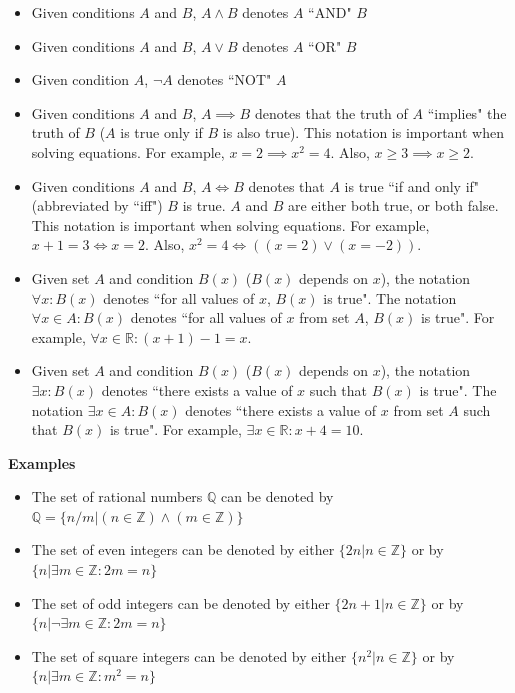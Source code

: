 \documentclass{article}
\begin{document}
\begin{itemize}
\item Given conditions \(A\) and \(B\), \(A \wedge B\) denotes \(A\) ``AND" \(B\)
\item Given conditions \(A\) and \(B\), \(A \vee B\) denotes \(A\) ``OR" \(B\)
\item Given condition \(A\), \(\neg A\) denotes ``NOT" \(A\)
\item Given conditions \(A\) and \(B\), \(A \implies B\) denotes that the truth of \(A\) ``implies" the truth of \(B\) (\(A\) is true only if \(B\) is also true). This notation is important when solving equations. For example, \(x = 2 \implies x^2 = 4\). Also, \(x \geq 3 \implies x \geq 2\).
\item Given conditions \(A\) and \(B\), \(A \iff B\) denotes that \(A\) is true ``if and only if" (abbreviated by ``iff") \(B\) is true. \(A\) and \(B\) are either both true, or both false. This notation is important when solving equations. For example, \(x + 1 = 3 \iff x = 2\). Also, \(x^2 = 4 \iff ((x = 2) \vee (x = -2))\).
\item Given set \(A\) and condition \(B(x)\) (\(B(x)\) depends on \(x\)), the notation \(\forall x : B(x)\) denotes ``for all values of \(x\), \(B(x)\) is true". The notation \(\forall x \in A : B(x)\) denotes ``for all values of \(x\) from set \(A\), \(B(x)\) is true". For example, \(\forall x \in \mathbb{R} : (x + 1) - 1 = x\).
\item Given set \(A\) and condition \(B(x)\) (\(B(x)\) depends on \(x\)), the notation \(\exists x : B(x)\) denotes ``there exists a value of \(x\) such that \(B(x)\) is true". The notation \(\exists x \in A : B(x)\) denotes ``there exists a value of \(x\) from set \(A\) such that \(B(x)\) is true". For example, \(\exists x \in \mathbb{R} : x + 4 = 10\).
\end{itemize}

\textbf{Examples}
\begin{itemize}
\item The set of rational numbers \(\mathbb{Q}\) can be denoted by \(\mathbb{Q} = \{n/m | (n \in \mathbb{Z}) \wedge (m \in \mathbb{Z})\}\)
\item The set of even integers can be denoted by either \(\{2n | n \in \mathbb{Z}\}\) or by \(\{n | \exists m \in \mathbb{Z} : 2m = n\}\)
\item The set of odd integers can be denoted by either \(\{2n+1 | n \in \mathbb{Z}\}\) or by \(\{n | \neg\exists m \in \mathbb{Z} : 2m = n\}\)
\item The set of square integers can be denoted by either \(\{n^2 | n \in \mathbb{Z}\}\) or by \(\{n | \exists m \in \mathbb{Z} : m^2 = n\}\)
\end{itemize}
\end{document}
